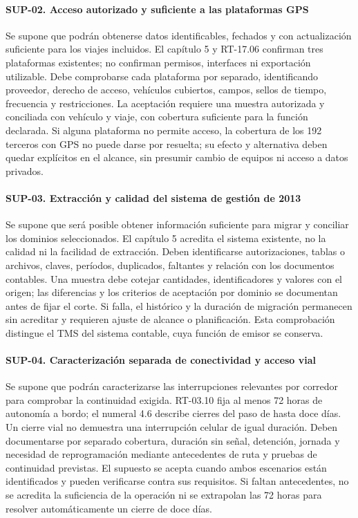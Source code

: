 \paragraph{SUP-02. Acceso autorizado y suficiente a las plataformas GPS}
Se supone que podrán obtenerse datos identificables, fechados y con actualización suficiente para los viajes incluidos. El capítulo 5 y RT-17.06 confirman tres plataformas existentes; no confirman permisos, interfaces ni exportación utilizable. Debe comprobarse cada plataforma por separado, identificando proveedor, derecho de acceso, vehículos cubiertos, campos, sellos de tiempo, frecuencia y restricciones. La aceptación requiere una muestra autorizada y conciliada con vehículo y viaje, con cobertura suficiente para la función declarada. Si alguna plataforma no permite acceso, la cobertura de los 192 terceros con GPS no puede darse por resuelta; su efecto y alternativa deben quedar explícitos en el alcance, sin presumir cambio de equipos ni acceso a datos privados.

\paragraph{SUP-03. Extracción y calidad del sistema de gestión de 2013}
Se supone que será posible obtener información suficiente para migrar y conciliar los dominios seleccionados. El capítulo 5 acredita el sistema existente, no la calidad ni la facilidad de extracción. Deben identificarse autorizaciones, tablas o archivos, claves, períodos, duplicados, faltantes y relación con los documentos contables. Una muestra debe cotejar cantidades, identificadores y valores con el origen; las diferencias y los criterios de aceptación por dominio se documentan antes de fijar el corte. Si falla, el histórico y la duración de migración permanecen sin acreditar y requieren ajuste de alcance o planificación. Esta comprobación distingue el TMS del sistema contable, cuya función de emisor se conserva.

\paragraph{SUP-04. Caracterización separada de conectividad y acceso vial}
Se supone que podrán caracterizarse las interrupciones relevantes por corredor para comprobar la continuidad exigida. RT-03.10 fija al menos 72 horas de autonomía a bordo; el numeral 4.6 describe cierres del paso de hasta doce días. Un cierre vial no demuestra una interrupción celular de igual duración. Deben documentarse por separado cobertura, duración sin señal, detención, jornada y necesidad de reprogramación mediante antecedentes de ruta y pruebas de continuidad previstas. El supuesto se acepta cuando ambos escenarios están identificados y pueden verificarse contra sus requisitos. Si faltan antecedentes, no se acredita la suficiencia de la operación ni se extrapolan las 72 horas para resolver automáticamente un cierre de doce días.

